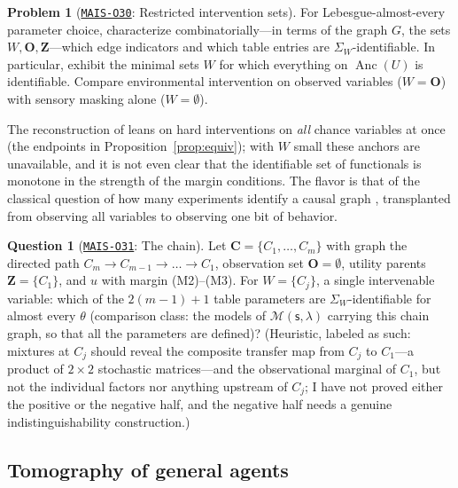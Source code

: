\documentclass[11pt]{amsart}
\newcommand{\Oid}[1]{\href{https://github.com/lionellevine/MAIS/blob/main/open-problems/MAIS-O#1.md}{\texttt{MAIS-O#1}}}
\theoremstyle{plain}
\theoremstyle{definition}
\newtheorem{problem}[theorem]{Problem}
\newtheorem{question}[theorem]{Question}
\DeclareMathOperator{\Anc}{Anc}
\newcommand{\bC}{\mathbf{C}}
\newcommand{\bO}{\mathbf{O}}
\newcommand{\bZ}{\mathbf{Z}}
\newcommand{\MM}{\mathcal{M}}
\newcommand{\sk}{\mathsf{s}}
\begin{document}
\begin{problem}[\Oid{30}: Restricted intervention sets]\label{prob:restricted}
For Lebesgue-almost-every parameter choice, characterize combinatorially---in terms of the graph $G$, the sets $W,\bO,\bZ$---which edge indicators and which table entries are $\Sigma_W$-identifiable. In particular, exhibit the minimal sets $W$ for which everything on $\Anc(U)$ is identifiable. Compare environmental intervention on observed variables ($W=\bO$) with sensory masking alone ($W=\emptyset$).
\end{problem}

The reconstruction of \cite{richens2024} leans on hard interventions on \emph{all} chance variables at once (the endpoints in Proposition~\ref{prop:equiv}); with $W$ small these anchors are unavailable, and it is not even clear that the identifiable set of functionals is monotone in the strength of the margin conditions. The flavor is that of the classical question of how many experiments identify a causal graph \cite{eberhardt2005}, transplanted from observing all variables to observing one bit of behavior.

\begin{question}[\Oid{31}: The chain]\label{q:chain}
Let $\bC=\{C_1,\dots,C_m\}$ with graph the directed path $C_m\to C_{m-1}\to\dots\to C_1$, observation set $\bO=\emptyset$, utility parents $\bZ=\{C_1\}$, and $u$ with margin (M2)--(M3). For $W=\{C_j\}$, a single intervenable variable: which of the $2(m-1)+1$ table parameters are $\Sigma_W$-identifiable for almost every $\theta$ (comparison class: the models of $\MM(\sk,\lambda)$ carrying this chain graph, so that all the parameters are defined)? (Heuristic, labeled as such: mixtures at $C_j$ should reveal the composite transfer map from $C_j$ to $C_1$---a product of $2\times2$ stochastic matrices---and the observational marginal of $C_1$, but not the individual factors nor anything upstream of $C_j$; I have not proved either the positive or the negative half, and the negative half needs a genuine indistinguishability construction.)
\end{question}

\subsection{Tomography of general agents}
\end{document}

